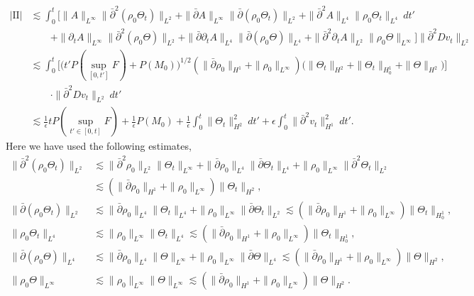 \documentclass[12pt,a4paper]{amsart}
\numberwithin{equation}{section}
\theoremstyle{plain}
\theoremstyle{definition}
\newcommand{\bpartial}{\bar{\partial}}
\begin{document}
\begin{align*}
|\mathrm{II}|&\lesssim \int_{0}^{t} \Big[\|A\|_{L^{\infty}}\|\bpartial^2 (\rho_0\Theta_t)\|_{L^2}
                 +\|\bpartial A\|_{L^{\infty}} \|\bpartial (\rho_0 \Theta_t)\|_{L^2}
                 +\|\bpartial^2 A\|_{L^4} \|\rho_0\Theta_t\|_{L^4} \ dt'\\
             &\qquad  
                 +\|\partial_t A\|_{L^{\infty}} \|\bpartial^2 (\rho_0\Theta)\|_{L^2}
                 +\|\bpartial\partial_t A\|_{L^4} \|\bpartial (\rho_0\Theta)\|_{L^4}
                 +\|\bpartial^2 \partial_t A\|_{L^2} \|\rho_0 \Theta\|_{L^{\infty}}
                 \Big]\|\bpartial^2 Dv_t\|_{L^2}\\
        &\lesssim \int_{0}^{t} \Big[ \Big( t'P(\sup\limits_{[0,t']}F)+P(M_0)  \Big)^{1/2}
        (\|\bpartial\rho_0\|_{H^1}+\|\rho_0\|_{L^{\infty}}) 
          \Big(\|\Theta_t\|_{H^2}+\|\Theta_t\|_{H_0^1}+\|\Theta\|_{H^2}\Big)
                \Big]\\
            &\qquad \cdot\|\bpartial^2 Dv_t\|_{L^2}\ dt'\\
     &\lesssim \frac{1}{\epsilon}tP(\sup\limits_{t'\in[0,t]}F)+\frac{1}{\epsilon}P(M_0)
         +\frac{1}{\epsilon}\int_{0}^{t}\|\Theta_t\|_{H^2}^2\ dt' 
         +\epsilon\int_{0}^{t} \|\bpartial^2 v_t\|_{H^1}^2\ dt'.
\end{align*}
Here we have used the following estimates,
\begin{align*}
\|\bpartial^2 (\rho_0\Theta_t)\|_{L^2}&\lesssim\|\bpartial^2\rho_0 \|_{L^2}\|\Theta_t\|_{L^{\infty}}
    +\|\bpartial\rho_0 \|_{L^4}\|\bpartial\Theta_t\|_{L^4}
    +\|\rho_0 \|_{L^{\infty}}\|\bpartial^2\Theta_t\|_{L^2}\\
                                      &\lesssim(\|\bpartial\rho_0\|_{H^1}+\|\rho_0\|_{L^{\infty}})\|\Theta_t\|_{H^2},\\
\|\bpartial (\rho_0 \Theta_t)\|_{L^2} &\lesssim\|\bpartial \rho_0\|_{L^4}\|\Theta_t\|_{L^4}
    +\|\rho_0\|_{L^{\infty}}\|\bpartial \Theta_t\|_{L^2}
   \lesssim(\|\bpartial\rho_0\|_{H^1}+\|\rho_0\|_{L^{\infty}})\|\Theta_t\|_{H_0^1},\\
\|\rho_0\Theta_t\|_{L^4}              & \lesssim\|\rho_0\|_{L^{\infty}}\| \Theta_t\|_{L^4}
    \lesssim (\|\bpartial\rho_0\|_{H^1}+\|\rho_0\|_{L^{\infty}})\|\Theta_t\|_{H_0^1},\\
\|\bpartial (\rho_0 \Theta)\|_{L^4}   &\lesssim\|\bpartial \rho_0\|_{L^4}\|\Theta\|_{L^{\infty}}
    +\|\rho_0\|_{L^{\infty}}\|\bpartial \Theta\|_{L^4}
       \lesssim(\|\bpartial\rho_0\|_{H^1}+\|\rho_0\|_{L^{\infty}})\|\Theta\|_{H^2},\\
\|\rho_0\Theta\|_{L^{\infty}}         &\lesssim \|\rho_0\|_{L^{\infty}}\| \Theta\|_{L^{\infty}}
       \lesssim (\|\bpartial\rho_0\|_{H^1}+\|\rho_0\|_{L^{\infty}})\|\Theta\|_{H^2}.
\end{align*}
\end{document}
